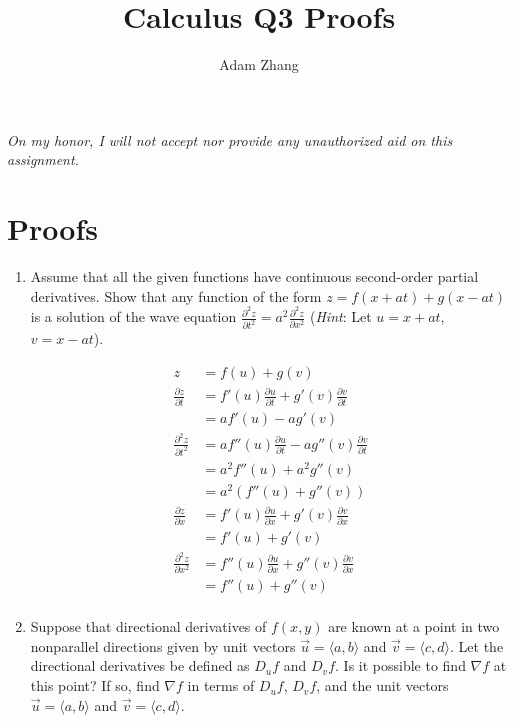 \documentclass[11pt]{article}
\title{Calculus Q3 Proofs}
\author{Adam Zhang}
\begin{document}
\pagestyle{fancy}

\begin{center}
  \emph{On my honor, I will not accept nor provide any unauthorized aid on this assignment.}
\end{center}

\section*{Proofs}
\begin{enumerate}
\item Assume that all the given functions have continuous second-order partial
  derivatives. Show that any function of the form \(z = f(x + at) + g(x - at) \)
  is a solution of the wave equation \(\frac{\partial^2 z}{\partial t^2} = a^2
  \frac{\partial^2 z}{\partial x^2}\) (\textit{Hint}: Let \( u = x + at \), \( v
  = x - at \)).

  \begin{align*}
    z &= f(u) + g(v) \\
    \frac{\partial z}{\partial t}
      &= f'(u) \frac{\partial u}{\partial t} + g'(v) \frac{\partial
        v}{\partial t} \\
      &= a f'(u) -a g'(v) \\
    \frac{\partial^2 z}{\partial t^2}
      &= a f''(u) \frac{\partial u}{\partial t} - a g''(v) \frac{\partial
        v}{\partial t} \\
      &= a^2 f''(u) + a^2 g''(v) \\
      &= a^2 (f''(u) + g''(v)) \\
    \frac{\partial z}{\partial x}
    &= f'(u) \frac{\partial u}{\partial x} + g'(v) \frac{\partial v}{\partial x}
    \\
      &= f'(u) + g'(v) \\
    \frac{\partial^2 z}{\partial x^2}
    &= f''(u) \frac{\partial u}{\partial x} + g''(v) \frac{\partial v}{\partial x} \\
    &= f''(u) + g''(v) \\
  \end{align*}

\item Suppose that directional derivatives of \(f(x,y)\) are known at a point in two nonparallel directions given by unit vectors \(\vec{u} = \langle a, b \rangle\) and \(\vec{v} = \langle c, d \rangle\). Let the directional derivatives be defined as \(D_{u} f\) and \(D_{v} f\). Is it possible to find \( \nabla f \) at this point? If so, find \(\nabla f\) in terms of \(D_{u} f\), \(D_{v} f\), and the unit vectors \(\vec{u} = \langle a, b \rangle\) and \(\vec{v} = \langle c, d \rangle\).


\end{enumerate}
\end{document}

